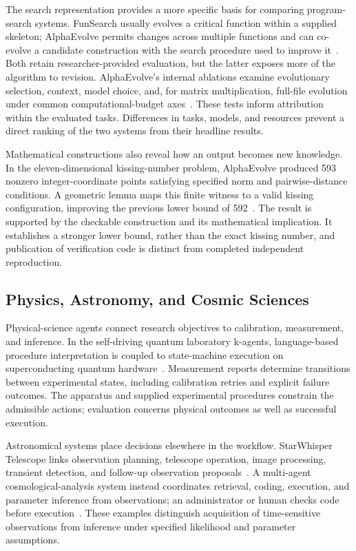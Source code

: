 The search representation provides a more specific basis for comparing program-search systems. FunSearch usually evolves a critical function within a supplied skeleton; AlphaEvolve permits changes across multiple functions and can co-evolve a candidate construction with the search procedure used to improve it~\cite{asd0512,asd0063}. Both retain researcher-provided evaluation, but the latter exposes more of the algorithm to revision. AlphaEvolve's internal ablations examine evolutionary selection, context, model choice, and, for matrix multiplication, full-file evolution under common computational-budget axes~\cite{asd0063}. These tests inform attribution within the evaluated tasks. Differences in tasks, models, and resources prevent a direct ranking of the two systems from their headline results.

Mathematical constructions also reveal how an output becomes new knowledge. In the eleven-dimensional kissing-number problem, AlphaEvolve produced 593 nonzero integer-coordinate points satisfying specified norm and pairwise-distance conditions. A geometric lemma maps this finite witness to a valid kissing configuration, improving the previous lower bound of 592~\cite{asd0063}. The result is supported by the checkable construction and its mathematical implication. It establishes a stronger lower bound, rather than the exact kissing number, and publication of verification code is distinct from completed independent reproduction.

\subsection{Physics, Astronomy, and Cosmic Sciences}

Physical-science agents connect research objectives to calibration, measurement, and inference. In the self-driving quantum laboratory k-agents, language-based procedure interpretation is coupled to state-machine execution on superconducting quantum hardware~\cite{asd0090}. Measurement reports determine transitions between experimental states, including calibration retries and explicit failure outcomes. The apparatus and supplied experimental procedures constrain the admissible actions; evaluation concerns physical outcomes as well as successful execution.

Astronomical systems place decisions elsewhere in the workflow. StarWhisper Telescope links observation planning, telescope operation, image processing, transient detection, and follow-up observation proposals~\cite{asd0136}. A multi-agent cosmological-analysis system instead coordinates retrieval, coding, execution, and parameter inference from observations; an administrator or human checks code before execution~\cite{asd0121}. These examples distinguish acquisition of time-sensitive observations from inference under specified likelihood and parameter assumptions.

